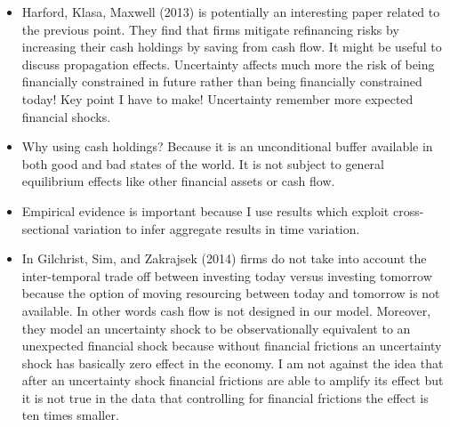 \documentclass{article}
\begin{document}
{\begin{itemize}
	\item Harford, Klasa, Maxwell (2013) is potentially an interesting paper related to the previous point. They find that firms mitigate refinancing risks by increasing their cash holdings by saving from cash flow. It might be useful to discuss propagation effects. Uncertainty affects much more the risk of being financially constrained in future rather than being financially constrained today! Key point I have to make! Uncertainty remember more expected financial shocks.
	\item Why using cash holdings? Because it is an unconditional buffer available in both good and bad states of the world. It is not subject to general equilibrium effects like other financial assets or cash flow. 
	\item Empirical evidence is important because I use results which exploit cross-sectional variation to infer aggregate results in time variation.
	\item In Gilchrist, Sim, and Zakrajsek (2014) firms do not take into account the inter-temporal trade off between investing today versus investing tomorrow because the option of moving resourcing between today and tomorrow is not available. In other words cash flow is not designed in our model. Moreover, they model an uncertainty shock to be observationally equivalent to an unexpected financial shock because without financial frictions an uncertainty shock has basically zero effect in the economy. I am not against the idea that after an uncertainty shock financial frictions are able to amplify its effect but it is not true in the data that controlling for financial frictions the effect is ten times smaller. 
\end{itemize}


}
\end{document}
